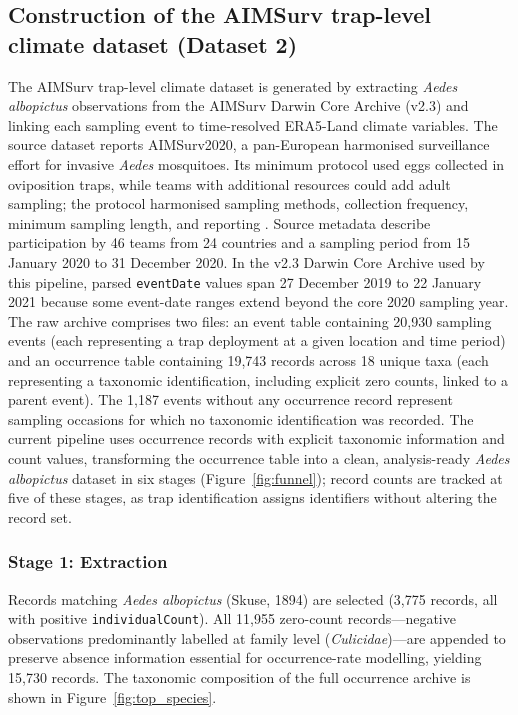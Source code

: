 \documentclass[11pt]{article}
\begin{document}
\subsection*{Construction of the AIMSurv trap-level climate dataset (Dataset 2)}

The AIMSurv trap-level climate dataset is generated by extracting 
\textit{Aedes albopictus} observations from the AIMSurv Darwin Core Archive 
(v2.3) and linking each sampling event to time-resolved ERA5-Land climate variables. 
The source dataset reports AIMSurv2020, a pan-European harmonised
surveillance effort for invasive \textit{Aedes} mosquitoes. Its minimum
protocol used eggs collected in oviposition traps, while teams with additional
resources could add adult sampling; the protocol harmonised sampling methods,
collection frequency, minimum sampling length, and reporting
\cite{miranda2022_aimsurv}. Source metadata describe participation by 46 teams
from 24 countries and a sampling period from 15 January 2020 to 31 December
2020. In the v2.3 Darwin Core Archive used by this pipeline, parsed
\texttt{eventDate} values span 27 December 2019 to 22 January 2021 because
some event-date ranges extend beyond the core 2020 sampling year.
The raw archive comprises two files: an event table containing 20,930 sampling 
events (each representing a trap deployment at a given location and time period) 
and an occurrence table containing 19,743 records across 18 unique taxa (each 
representing a taxonomic identification, including explicit zero counts, linked 
to a parent event). The 1,187 events without any occurrence record represent 
sampling occasions for which no taxonomic identification was recorded. The
current pipeline uses occurrence records with explicit taxonomic information
and count values, transforming the occurrence table into a clean,
analysis-ready \textit{Aedes albopictus} dataset in six stages
(Figure~\ref{fig:funnel}); record counts are tracked at five of these stages,
as trap identification assigns identifiers without altering the record set.

\subsubsection*{Stage 1: Extraction}
Records matching \textit{Aedes albopictus} (Skuse, 1894) are selected 
(3,775 records, all with positive \texttt{individualCount}). All 11,955 
zero-count records---negative observations predominantly labelled at 
family level (\textit{Culicidae})---are appended to preserve absence 
information essential for occurrence-rate modelling, yielding 15,730 
records. The taxonomic composition of the full occurrence archive is shown in 
Figure~\ref{fig:top_species}.
\end{document}
